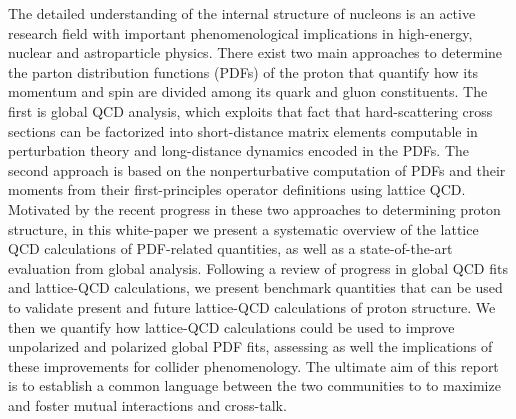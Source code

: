 \documentclass[11pt,a4paper]{article}
\begin{document}
The detailed understanding of the internal structure of nucleons is an active
research field with important phenomenological implications in
high-energy, nuclear and astroparticle physics.
%
There exist two main approaches to determine the
parton distribution functions (PDFs) of the proton that
quantify how its momentum and spin 
are divided among its quark and gluon constituents.
%
The first is global QCD analysis, which exploits that fact that hard-scattering
cross sections can be factorized into short-distance matrix elements
computable in perturbation theory and long-distance dynamics encoded in the
PDFs.
%
The second approach is based on the nonperturbative
 computation of PDFs
and their moments from their first-principles operator
definitions using lattice QCD.
%
Motivated by the recent progress in these two approaches
to determining proton structure, in this white-paper we present a systematic
overview of the lattice QCD calculations of PDF-related quantities, as
well as a
state-of-the-art evaluation from global analysis.
%
Following a review of progress in global QCD fits and lattice-QCD calculations, we present benchmark quantities that can be
used to validate present and future
lattice-QCD calculations of proton structure.
%
We then
we quantify how lattice-QCD calculations could be used
to improve unpolarized and polarized global PDF fits, assessing as
well the implications of these improvements for collider
phenomenology.
%
The ultimate aim of this report is
to establish a common language between the two communities to 
to maximize and foster mutual interactions and cross-talk.

\clearpage


\tableofcontents













\end{document}
